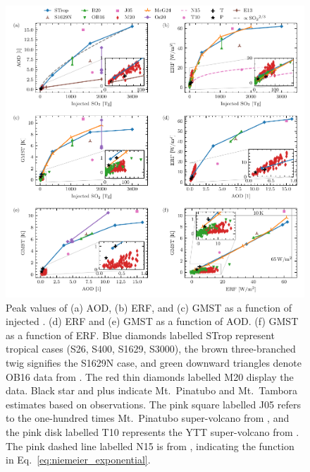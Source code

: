 \documentclass[draft]{agujournal2019}
\begin{document}
  \begin{figure}
    \centering \includegraphics[width=\textwidth]{figure4}

    \caption{Peak values of (a) AOD, (b) ERF, and (c) GMST as a
      function of injected \@. (d) ERF and (e) GMST as a function of AOD. (f)
      GMST as a function of ERF. Blue diamonds labelled STrop represent tropical cases
      (S26, S400, S1629, S3000), the brown three-branched twig signifies the S1629N
      case, and green downward triangles denote OB16 data from .
      The red thin diamonds labelled M20 display the  data.
      Black star and plus indicate Mt.\ Pinatubo and Mt.\ Tambora estimates based on
      observations. The pink square labelled J05 refers to the one-hundred times
      Mt.\ Pinatubo super-volcano from , and the pink disk labelled T10
      represents the YTT super-volcano from . The pink dashed line
      labelled N15 is from , indicating the function in
      Eq.~\ref{eq:niemeier_exponential}.}\label{fig:4_parameter_scan}%
  \end{figure}
\end{document}
